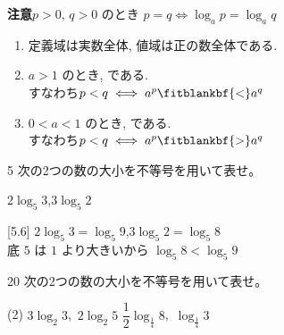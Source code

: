 \documentclass[14pt,dvipdfmx]{jsarticle}
\begin{document}
\vspace{0.05em}
\textbf{注意}\quad $p>0$, $q>0$ のとき\quad
$p=q \iff \log_{a} p = \log_{a} q$
\vspace{0.15em}

\begin{tcolorbox}[mathbox, colback=blue!5, colframe=blue!70!black, boxrule=1.2pt,
    title={再掲\quad 定理 5.1.3\quad 指数関数 $y=a^{x}$ の特徴}]
  \begin{enumerate}[label=\textbf{\arabic*}, leftmargin=1.5zw, itemsep=0.10em]
    \item 定義域は実数全体, 値域は正の数全体である.
    \item $a>1$ のとき, である.\\
          すなわち\quad $p<q \iff a^{p} \fitblankbf{<} a^{q}$
    \item $0<a<1$ のとき, である.\\
          すなわち\quad $p<q \iff a^{p} \fitblankbf{>} a^{q}$
  \end{enumerate}
\end{tcolorbox}

\vfill
\nextpage

\vspace{-1.4zw}%

\begin{exampleprob}{5}
  次の2つの数の大小を不等号を用いて表せ。
  \par\vspace{-0.3em}
  \hspace*{1zw}$2\log_{5} 3$,\quad $3\log_{5} 2$
\end{exampleprob}
\begin{answerbox}{}[5.6]
  $2\log_{5} 3=\log_{5} 9$,\quad $3\log_{5} 2=\log_{5} 8$\\
  底 $5$ は $1$ より大きいから \qquad $\log_{5} 8<\log_{5} 9$\par\vspace{0.25em}
\end{answerbox}

\begin{practiceprob}{20}
  次の2つの数の大小を不等号を用いて表せ。
  \par\vspace{-0.3em}
  \begin{tasks}[label=(\arabic*), label-width=1.6zw, item-indent=2zw, after-item-skip=0.04em](2)
    \task $3\log_{2} 3$,\ $2\log_{2} 5$
    \task $\dfrac{1}{2}\log_{\frac{1}{4}} 8$,\ $\log_{\frac{1}{4}} 3$
  \end{tasks}
\end{practiceprob}
\end{document}
